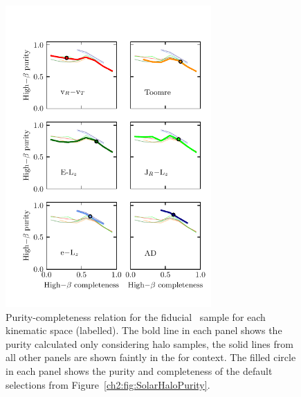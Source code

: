 \begin{figure}
    \centering
    \includegraphics[width=0.7\textwidth]{figure/ch2/SolarHaloCompletenessPurity.pdf}
    \caption{Purity-completeness relation for the fiducial \solar\ sample for each kinematic space (labelled). The bold line in each panel shows the purity calculated only considering halo samples, the solid lines from all other panels are shown faintly in the for context. The filled circle in each panel shows the purity and completeness of the default selections from Figure~\ref{ch2:fig:SolarHaloPurity}.}
    \label{ch2:fig:SolarCPDiagram}
\end{figure}

